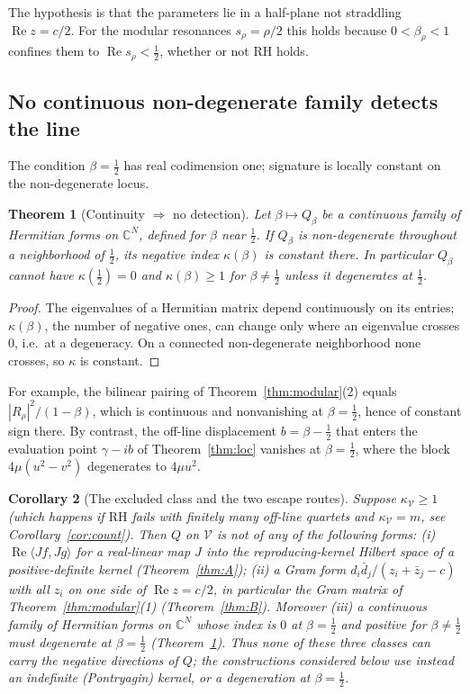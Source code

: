 \documentclass[11pt]{amsart}
\newtheorem{theorem}{Theorem}[section]
\newtheorem{corollary}[theorem]{Corollary}
\theoremstyle{definition}
\theoremstyle{remark}
\newcommand{\RH}{\mathrm{RH}}
\renewcommand{\Re}{\operatorname{Re}}
\newcommand{\half}{\tfrac12}
\newcommand{\kV}{\kappa_{\mathcal V}}
\begin{document}
The hypothesis is that the parameters lie in a half-plane not straddling $\Re z=c/2$. For the
modular resonances $s_\rho=\rho/2$ this holds because $0<\beta_\rho<1$ confines them to
$\Re s_\rho<\half$, whether or not $\RH$ holds.

\subsection{No continuous non-degenerate family detects the line}
The condition $\beta=\half$ has real codimension one; signature is locally constant on the
non-degenerate locus.

\begin{theorem}[Continuity $\Rightarrow$ no detection]\label{thm:C}
Let $\beta\mapsto Q_\beta$ be a continuous family of Hermitian forms on $\mathbb C^N$, defined for
$\beta$ near $\half$. If $Q_\beta$ is non-degenerate throughout a neighborhood of $\half$, its
negative index $\kappa(\beta)$ is constant there. In particular $Q_\beta$ cannot have
$\kappa(\half)=0$ and $\kappa(\beta)\ge1$ for $\beta\ne\half$ unless it degenerates at $\half$.
\end{theorem}
\begin{proof}
The eigenvalues of a Hermitian matrix depend continuously on its entries; $\kappa(\beta)$, the
number of negative ones, can change only where an eigenvalue crosses $0$, i.e.\ at a degeneracy.
On a connected non-degenerate neighborhood none crosses, so $\kappa$ is constant.
\end{proof}

For example, the bilinear pairing of Theorem~\ref{thm:modular}(2) equals
$|R_\rho|^2/(1-\beta)$, which is continuous and nonvanishing at $\beta=\half$, hence of constant
sign there. By contrast, the off-line displacement $b=\beta-\half$ that enters the evaluation
point $\gamma-ib$ of Theorem~\ref{thm:loc} vanishes at $\beta=\half$, where the block
$4\mu(u^2-v^2)$ degenerates to $4\mu u^2$.

\begin{corollary}[The excluded class and the two escape routes]\label{cor:class}
Suppose $\kV\ge1$ (which happens if $\RH$ fails with finitely many off-line quartets and
$\kV=m$, see Corollary~\ref{cor:count}). Then $Q$ on $\mathcal V$ is not of any of the following
forms: \emph{(i)} $\Re\langle Jf,Jg\rangle$ for a real-linear map $J$ into the
reproducing-kernel Hilbert space of a positive-definite kernel (Theorem~\ref{thm:A});
\emph{(ii)} a Gram form $d_i\bar d_j/(z_i+\bar z_j-c)$ with all $z_i$ on one side of
$\Re z=c/2$, in particular the Gram matrix of Theorem~\ref{thm:modular}(1)
(Theorem~\ref{thm:B}). Moreover \emph{(iii)} a continuous family of Hermitian forms on
$\mathbb C^N$ whose index is $0$ at $\beta=\half$ and positive for $\beta\neq\half$ must
degenerate at $\beta=\half$ (Theorem~\ref{thm:C}). Thus none of these three classes can carry the
negative directions of $Q$; the constructions considered below use instead an \emph{indefinite
(Pontryagin) kernel}, or a \emph{degeneration at $\beta=\half$}.
\end{corollary}
\end{document}
